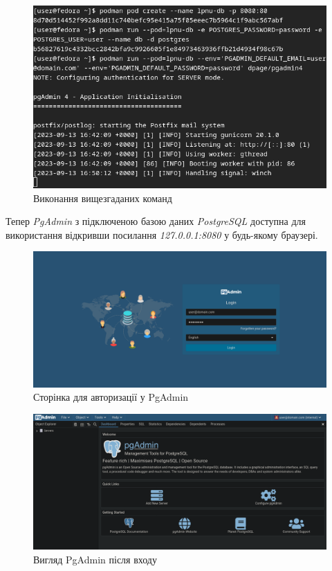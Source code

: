 \documentclass[14pt]{extreport}
\begin{document}
\begin{normalsize}
	\begin{figure}[H]
		\centering
		\includegraphics[scale=0.6]{1}
		\caption{Виконання вищезгаданих команд}
	\end{figure}
	
	Тепер \textit{PgAdmin} з підключеною базою даних \textit{PostgreSQL} доступна для використання відкривши посилання \textit{127.0.0.1:8080} у будь-якому браузері.

	
	\begin{figure}[H]
		\centering
		\includegraphics[scale=0.35]{2}
		\caption{Сторінка для авторизації у PgAdmin}
	\end{figure}


	\begin{figure}[H]
		\centering
		\includegraphics[scale=0.35]{3}
		\caption{Вигляд PgAdmin після входу}
	\end{figure}


\end{normalsize}
\end{document}
